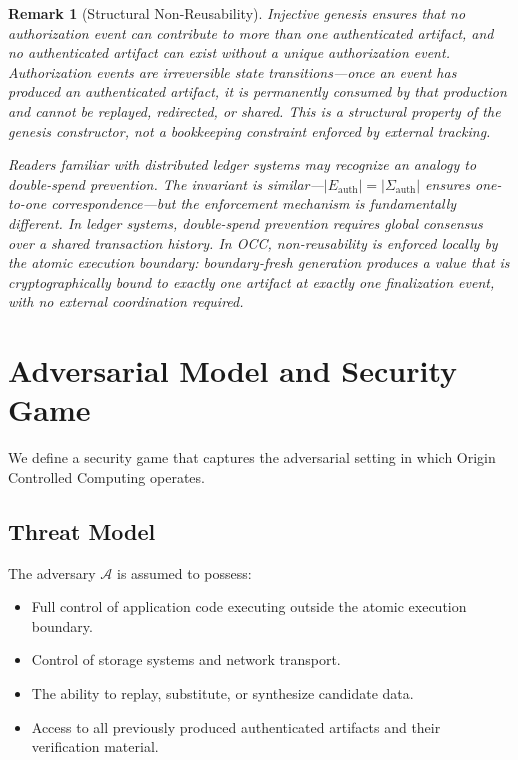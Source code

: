 \documentclass[11pt,letterpaper]{article}
\theoremstyle{occplain}
\theoremstyle{occremark}
\newtheorem{remark}{Remark}[section]
\newcommand{\Sigauth}{\Sigma_{\mathrm{auth}}}
\newcommand{\Eauth}{E_{\mathrm{auth}}}
\begin{document}
\begin{remark}[Structural Non-Reusability]
\label{rem:non-reusability}
Injective genesis ensures that no authorization event can contribute to more than one authenticated artifact, and no authenticated artifact can exist without a unique authorization event. Authorization events are irreversible state transitions---once an event has produced an authenticated artifact, it is permanently consumed by that production and cannot be replayed, redirected, or shared. This is a structural property of the genesis constructor, not a bookkeeping constraint enforced by external tracking.

Readers familiar with distributed ledger systems may recognize an analogy to double-spend prevention. The invariant is similar---$|\Eauth| = |\Sigauth|$ ensures one-to-one correspondence---but the enforcement mechanism is fundamentally different. In ledger systems, double-spend prevention requires global consensus over a shared transaction history. In OCC, non-reusability is enforced locally by the atomic execution boundary: boundary-fresh generation produces a value that is cryptographically bound to exactly one artifact at exactly one finalization event, with no external coordination required.
\end{remark}


\section{Adversarial Model and Security Game}
\label{sec:security}

We define a security game that captures the adversarial setting in which Origin Controlled Computing operates.


\subsection{Threat Model}
\label{sec:threat-model}

The adversary $\mathcal{A}$ is assumed to possess:
\begin{itemize}
  \item Full control of application code executing outside the atomic execution boundary.
  \item Control of storage systems and network transport.
  \item The ability to replay, substitute, or synthesize candidate data.
  \item Access to all previously produced authenticated artifacts and their verification material.
\end{itemize}
\end{document}
